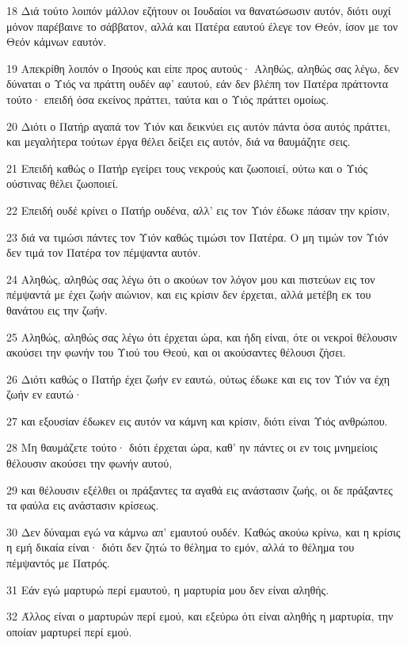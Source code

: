 \par 18 Διά τούτο λοιπόν μάλλον εζήτουν οι Ιουδαίοι να θανατώσωσιν αυτόν, διότι ουχί μόνον παρέβαινε το σάββατον, αλλά και Πατέρα εαυτού έλεγε τον Θεόν, ίσον με τον Θεόν κάμνων εαυτόν.
\par 19 Απεκρίθη λοιπόν ο Ιησούς και είπε προς αυτούς· Αληθώς, αληθώς σας λέγω, δεν δύναται ο Υιός να πράττη ουδέν αφ' εαυτού, εάν δεν βλέπη τον Πατέρα πράττοντα τούτο· επειδή όσα εκείνος πράττει, ταύτα και ο Υιός πράττει ομοίως.
\par 20 Διότι ο Πατήρ αγαπά τον Υιόν και δεικνύει εις αυτόν πάντα όσα αυτός πράττει, και μεγαλήτερα τούτων έργα θέλει δείξει εις αυτόν, διά να θαυμάζητε σεις.
\par 21 Επειδή καθώς ο Πατήρ εγείρει τους νεκρούς και ζωοποιεί, ούτω και ο Υιός ούστινας θέλει ζωοποιεί.
\par 22 Επειδή ουδέ κρίνει ο Πατήρ ουδένα, αλλ' εις τον Υιόν έδωκε πάσαν την κρίσιν,
\par 23 διά να τιμώσι πάντες τον Υιόν καθώς τιμώσι τον Πατέρα. Ο μη τιμών τον Υιόν δεν τιμά τον Πατέρα τον πέμψαντα αυτόν.
\par 24 Αληθώς, αληθώς σας λέγω ότι ο ακούων τον λόγον μου και πιστεύων εις τον πέμψαντά με έχει ζωήν αιώνιον, και εις κρίσιν δεν έρχεται, αλλά μετέβη εκ του θανάτου εις την ζωήν.
\par 25 Αληθώς, αληθώς σας λέγω ότι έρχεται ώρα, και ήδη είναι, ότε οι νεκροί θέλουσιν ακούσει την φωνήν του Υιού του Θεού, και οι ακούσαντες θέλουσι ζήσει.
\par 26 Διότι καθώς ο Πατήρ έχει ζωήν εν εαυτώ, ούτως έδωκε και εις τον Υιόν να έχη ζωήν εν εαυτώ·
\par 27 και εξουσίαν έδωκεν εις αυτόν να κάμνη και κρίσιν, διότι είναι Υιός ανθρώπου.
\par 28 Μη θαυμάζετε τούτο· διότι έρχεται ώρα, καθ' ην πάντες οι εν τοις μνημείοις θέλουσιν ακούσει την φωνήν αυτού,
\par 29 και θέλουσιν εξέλθει οι πράξαντες τα αγαθά εις ανάστασιν ζωής, οι δε πράξαντες τα φαύλα εις ανάστασιν κρίσεως.
\par 30 Δεν δύναμαι εγώ να κάμνω απ' εμαυτού ουδέν. Καθώς ακούω κρίνω, και η κρίσις η εμή δικαία είναι· διότι δεν ζητώ το θέλημα το εμόν, αλλά το θέλημα του πέμψαντός με Πατρός.
\par 31 Εάν εγώ μαρτυρώ περί εμαυτού, η μαρτυρία μου δεν είναι αληθής.
\par 32 Άλλος είναι ο μαρτυρών περί εμού, και εξεύρω ότι είναι αληθής η μαρτυρία, την οποίαν μαρτυρεί περί εμού.
